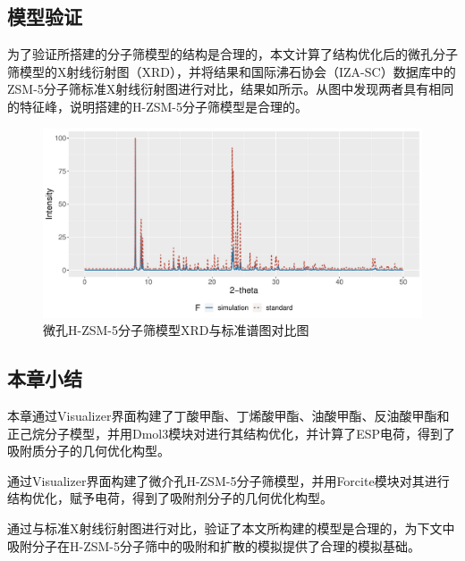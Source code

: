\subsection{模型验证}
\par{为了验证所搭建的分子筛模型的结构是合理的，本文计算了结构优化后的微孔分子筛模型的X射线衍射图（XRD），并将结果和国际沸石协会（IZA-SC）数据库中的ZSM-5分子筛标准X射线衍射图\cite{baerlocher2007atlas}进行对比，结果如所示。从图中发现两者具有相同的特征峰，说明搭建的H-ZSM-5分子筛模型是合理的。}
\begin{figure}[H]
    \centering
    \includegraphics[height=0.5\textwidth]{figure/Building/XRD.pdf}
    \caption{微孔H-ZSM-5分子筛模型XRD与标准谱图对比图}
    \label{fig:XRD}
\end{figure}
\subsection{本章小结}
\par{本章通过Visualizer界面构建了丁酸甲酯、丁烯酸甲酯、油酸甲酯、反油酸甲酯和正己烷分子模型，并用Dmol3模块对进行其结构优化，并计算了ESP电荷，得到了吸附质分子的几何优化构型。}
\par{通过Visualizer界面构建了微介孔H-ZSM-5分子筛模型，并用Forcite模块对其进行结构优化，赋予电荷，得到了吸附剂分子的几何优化构型。}
\par{通过与标准X射线衍射图进行对比，验证了本文所构建的模型是合理的，为下文中吸附分子在H-ZSM-5分子筛中的吸附和扩散的模拟提供了合理的模拟基础。}
